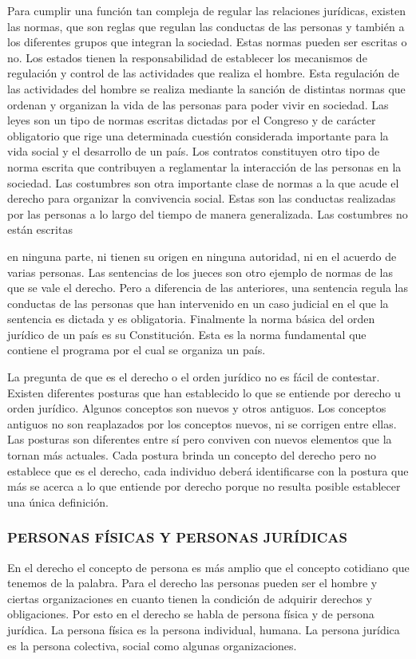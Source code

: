 Para cumplir una función tan compleja de regular las relaciones jurídicas, existen las normas, que son reglas que regulan las conductas de las personas y también a los diferentes grupos que integran la sociedad. Estas normas pueden ser escritas o no. Los estados tienen la responsabilidad de establecer los mecanismos de regulación y control de las actividades que realiza el hombre. Esta regulación de las actividades del hombre se realiza mediante la sanción de distintas normas que ordenan y organizan la vida de las personas para poder vivir en sociedad. Las leyes son un tipo de normas escritas dictadas por el Congreso y de carácter obligatorio que rige una determinada cuestión considerada importante para la vida social y el desarrollo de un país. Los contratos constituyen otro tipo de norma escrita que contribuyen a reglamentar la interacción de las personas en la sociedad. Las costumbres son otra importante clase de normas a la que acude el derecho para organizar la convivencia social. Estas son las conductas realizadas por las personas a lo largo del tiempo de manera generalizada. Las costumbres no están escritas



en ninguna parte, ni tienen su origen en ninguna autoridad, ni en el acuerdo de varias personas. Las sentencias de los jueces son otro ejemplo de normas de las que se vale el derecho. Pero a diferencia de las anteriores, una sentencia regula las conductas de las personas que han intervenido en un caso judicial en el que la sentencia es dictada y es obligatoria. Finalmente la norma básica del orden jurídico de un país es su Constitución. Esta es la norma fundamental que contiene el programa por el cual se organiza un país.

La pregunta de que es el derecho o el orden jurídico no es fácil de contestar. Existen diferentes posturas que han establecido lo que se entiende por derecho u orden jurídico. Algunos conceptos son nuevos y otros antiguos. Los conceptos antiguos no son reaplazados por los conceptos nuevos, ni se corrigen entre ellas. Las posturas son diferentes entre sí pero conviven con nuevos elementos que la tornan más actuales. Cada postura brinda un concepto del derecho pero no establece que es el derecho, cada individuo deberá identificarse con la postura que más se acerca a lo que entiende por derecho porque no resulta posible establecer una única definición.

\subsubsection*{PERSONAS FÍSICAS Y PERSONAS JURÍDICAS}
En el derecho el concepto de persona es más amplio que el concepto cotidiano que tenemos de la palabra. Para el derecho las personas pueden ser el hombre y ciertas organizaciones en cuanto tienen la condición de adquirir derechos y obligaciones. Por esto en el derecho se habla de persona física y de persona jurídica. La persona física es la persona individual, humana. La persona jurídica es la persona colectiva, social como algunas organizaciones.

